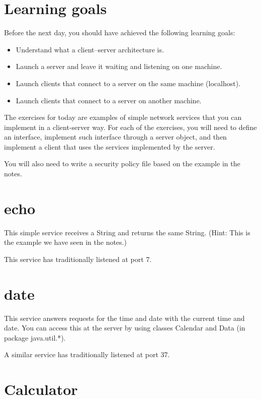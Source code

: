 \documentclass{article}
\begin{document}
\section*{Learning goals}
\label{sec:learning-goals}

Before the next day, you should have achieved the following learning
goals: 

\begin{itemize}
\item Understand what a client--server architecture is.
\item Launch a server and leave it waiting and listening on one
  machine. 
\item Launch clients that connect to a server on the same machine
  (localhost). 
\item Launch clients that connect to a server on another machine. 
\end{itemize}

The exercises for today are examples of simple network services that
you can implement in a client-server way. For each of the exercises,
you will need to define an interface, implement such interface through
a server object, and then implement a client that uses the services
implemented by the server. 

You will also need to write a security
policy file based on the example in the notes.

\section{echo}
\label{sec:echo}

This simple service receives a String and returns the same
String. (Hint: This is the example we have seen in the notes.) 

This service has traditionally listened at port 7.

\section{date}
\label{sec:date}

This service answers requests for the time and date with the current time and 
date. You can access this at the server by using classes Calendar and Data (in
package java.util.*).

A similar service has traditionally listened at port 37.

\section{Calculator}
\label{sec:calculator}
\end{document}
